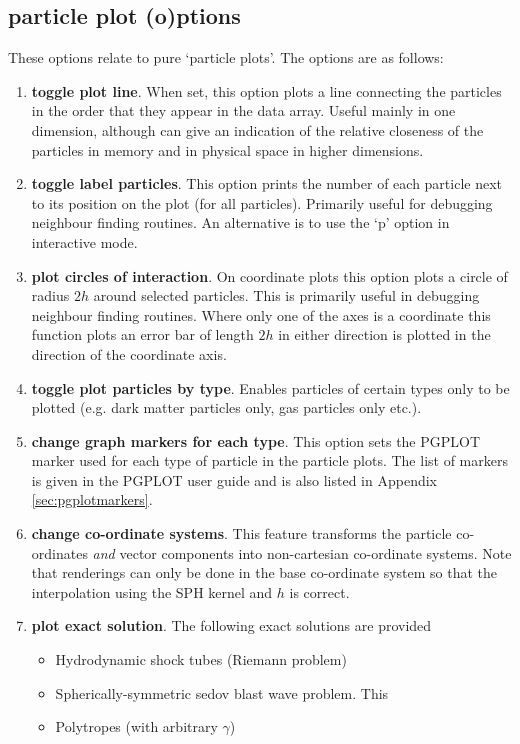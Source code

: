 \documentclass[a4paper,12pt]{article}
\begin{document}
\subsection{particle plot (o)ptions}
 These options relate to pure `particle plots'. The options are as follows:
\begin{enumerate}
\item \textbf{toggle plot line}. When set, this option plots a line connecting the particles
in the order that they appear in the data array. Useful mainly in one dimension, although can give an indication of the
relative closeness of the particles in memory and in physical space in higher dimensions.
\item \textbf{toggle label particles}. This option prints the number of each particle
next to its position on the plot (for all particles). Primarily useful for debugging neighbour finding
routines. An alternative is to use the `p' option in interactive mode.
\item \textbf{plot circles of interaction}. On coordinate plots this option plots a circle of
radius $2h$ around selected particles. 
This is primarily useful in debugging neighbour finding routines. Where only one of the axes is a 
coordinate this function plots an error bar of length $2h$ in either direction is plotted
in the direction of the coordinate axis.
\item \textbf{toggle plot particles by type}. Enables particles of certain types only to be plotted
(e.g. dark matter particles only, gas particles only etc.).
\item \textbf{change graph markers for each type}. This option sets the PGPLOT marker used for each
type of particle in the particle plots. The list of markers is given in the
PGPLOT user guide and is also listed in Appendix \ref{sec:pgplotmarkers}. 
\item \textbf{change co-ordinate systems}. This feature transforms the particle
co-ordinates \emph{and} vector components into non-cartesian co-ordinate systems. Note that
renderings can only be done in the base co-ordinate system so that the interpolation using the SPH
kernel and $h$ is correct.  
\item \textbf{plot exact solution}. The following exact solutions are provided
\begin{itemize}
\item Hydrodynamic shock tubes (Riemann problem)
\item Spherically-symmetric sedov blast wave problem. This
\item Polytropes (with arbitrary $\gamma$)

\end{itemize}
\end{enumerate}
\end{document}
